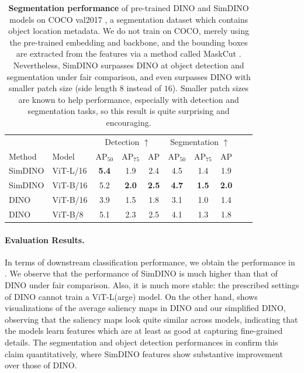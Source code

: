 \documentclass[../../book-main.tex]{subfiles}
\begin{document}
\begin{table}
\caption{\small\textbf{Segmentation performance} of pre-trained DINO
    and SimDINO models on COCO val2017 \citep{lin2014microsoft}, a
    segmentation dataset which contains object location metadata. We do
    not train on COCO, merely using the pre-trained embedding and
    backbone, and the bounding boxes are extracted from the features via
    a method called MaskCut \citep{wang2023cut}. Nevertheless, SimDINO
    surpasses DINO at object detection and segmentation under fair
    comparison, and even surpasses DINO with smaller patch size (side
    length \(8\) instead of \(16\)). Smaller patch sizes are known to
    help performance, especially with detection and segmentation tasks,
so this result is quite surprising and encouraging.}
\centering
\begin{tabular}{@{}llcccccccc@{}}
    \toprule
    &  & \multicolumn{3}{c}{Detection $\uparrow$} &
    \multicolumn{3}{c}{Segmentation $\uparrow$} \\
    Method & Model & AP$_{50}$  & AP$_{75}$ & AP & AP$_{50}$ &
    AP$_{75}$ & AP  \\
    \midrule
    SimDINO &ViT-L/16 &\bf 5.4 &1.9 &2.4 &4.5 &1.4 &1.9 \\
    SimDINO &ViT-B/16 &5.2 & \bf 2.0 & \bf 2.5 & \bf4.7 & \bf 1.5 & \bf 2.0 \\
    DINO &ViT-B/16 &3.9 &1.5 &1.8 &3.1 &1.0 &1.4 \\
    \midrule
    \color{gray} DINO & \color{gray} ViT-B/8 & \color{gray}5.1 &
    \color{gray}2.3 & \color{gray}2.5 & \color{gray}4.1 &
    \color{gray}1.3 & \color{gray}1.8 \\
    \bottomrule
\end{tabular}
\label{tab:dino_segmentation}
\end{table}

\paragraph{Evaluation Results.} In terms of downstream classification
performance, we obtain the performance in
. We observe that the
performance of SimDINO is much higher than that of DINO under fair
comparison. Also, it is much more stable: the prescribed settings of
DINO cannot train a ViT-L(arge) model. On the other hand,
 shows visualizations of the
average saliency maps in DINO and our simplified DINO, observing that
the saliency maps look quite similar across models, indicating that
the models learn features which are at least as good at capturing
fine-grained details. The segmentation and object detection
performances in  confirm this claim
quantitatively, where SimDINO features show substantive improvement
over those of DINO.
\end{document}
